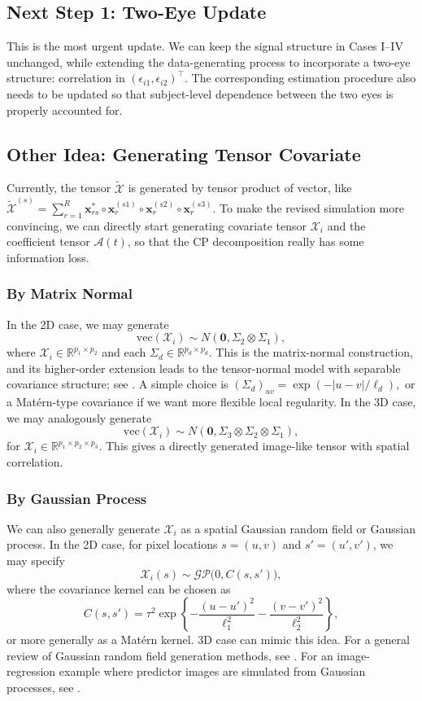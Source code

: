 \documentclass[10pt]{notes}
\begin{document}
\subsection*{Next Step 1: Two-Eye Update}
This is the most urgent update. We can keep the signal structure in Cases I--IV unchanged, while extending the data-generating process to incorporate a two-eye structure: correlation in $(\epsilon_{i1},\epsilon_{i2})^\top$. The corresponding estimation procedure also needs to be updated so that subject-level dependence between the two eyes is properly accounted for.

\subsection{Other Idea: Generating Tensor Covariate}
Currently, the tensor $\tilde{\mathcal{X}}$ is generated by tensor product of vector, like 
$\tilde{\mathcal{X}}^{(s)}
    =
    \sum_{r=1}^{R}
    \mathbf{x}_{rs}^*
    \circ
    \mathbf{x}_r^{(s1)}
    \circ
    \mathbf{x}_r^{(s2)}
    \circ
    \mathbf{x}_r^{(s3)}$.
To make the revised simulation more convincing, we can directly start generating covariate tensor $\mathcal{X}_i$ and the coefficient tensor $\mathcal{A}(t)$, so that the CP decomposition really has some information loss.

\subsubsection{By Matrix Normal}
In the 2D case, we may generate
\[
\mathrm{vec}(\mathcal{X}_i)
\sim
N\!\left(
\mathbf{0},
\Sigma_2 \otimes \Sigma_1
\right),
\]
where $\mathcal{X}_i \in \mathbb{R}^{p_1 \times p_2}$ and each
$\Sigma_d \in \mathbb{R}^{p_d \times p_d}$. This is the matrix-normal
construction, and its higher-order extension leads to the tensor-normal model
with separable covariance structure; see \cite{manceur2013}. A simple choice is
$
(\Sigma_d)_{uv} = \exp\!\left(- |u-v|/\ell_d \right),
$
or a Mat\'ern-type covariance if we want more flexible local regularity. In
the 3D case, we may analogously generate
\[
\mathrm{vec}(\mathcal{X}_i)
\sim
N\!\left(
\mathbf{0},
\Sigma_3 \otimes \Sigma_2 \otimes \Sigma_1
\right),
\]
for $\mathcal{X}_i \in \mathbb{R}^{p_1 \times p_2 \times p_3}$. This gives a
directly generated image-like tensor with spatial correlation.

\subsubsection{By Gaussian Process}
We can also
generally generate $\mathcal{X}_i$ as a spatial Gaussian random field or
Gaussian process. In the 2D case, for pixel locations
$s=(u,v)$ and $s'=(u',v')$, we may specify
\[
\mathcal{X}_i(s) \sim \mathcal{GP}\bigl(0, C(s,s')\bigr),
\]
where the covariance kernel can be chosen as
\[
C(s,s')
=
\tau^2 \exp\left\{
-\frac{(u-u')^2}{\ell_1^2}
-\frac{(v-v')^2}{\ell_2^2}
\right\},
\]
or more generally as a Mat\'ern kernel. 3D case can mimic this idea.
For a general review of Gaussian random field generation methods, see
\cite{liu2019}. For an image-regression example where predictor images are
simulated from Gaussian processes, see \cite{guo2022}.
\end{document}
